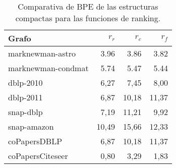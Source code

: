 \begin{table}
	\caption{Comparativa de BPE de las estructuras compactas para las funciones de ranking.}
	\label{table:bpe3}
	\centering
	\begin{tabular}{l|r|r|r}
		\toprule
		Grafo & $r_{r}$ & $r_{c}$ & $r_{f}$\\
		\midrule
		marknewman-astro & 3.96 & 3.86 & 3.82 \\
		marknewman-condmat & 5.74 & 5.47 & 5.44 \\
		dblp-2010 & 6,27 & 7,45 & 8,00 \\
        dblp-2011 & 6,87 & 10,18 & 11,37 \\
		snap-dblp & 7,19 & 11,21 & 9,92 \\
        snap-amazon & 10,49 & 15,66 & 12,33 \\
        coPapersDBLP & 6,87 & 10,18 & 11,37 \\
        coPapersCiteseer & 0,80 & 3,29 & 1,83 \\
        \bottomrule
	\end{tabular}
\end{table}
